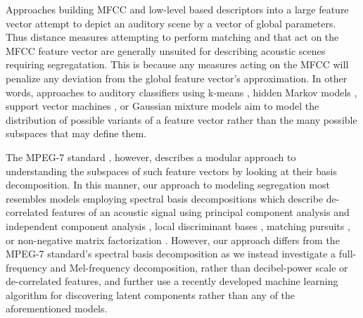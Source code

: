 \documentclass[a4paper,10pt,final]{ThesisStyle}
\begin{document}



Approaches building MFCC and low-level based descriptors into a large feature vector attempt to depict an auditory scene by a vector of global parameters. Thus distance measures attempting to perform matching and that act on the MFCC feature vector are generally unsuited for describing acoustic scenes requiring segregatation.  This is because any measures acting on the MFCC will penalize any deviation from the global feature vector's approximation.  In other words, approaches to auditory classifiers using k-means \cite{Harma2005,Eronen2006,Allamanche2001}, hidden Markov models \cite{Eronen2006,Mesaros2010}, support vector machines \cite{Guo2003a}, or Gaussian mixture models \cite{Wang2011,Aucouturier2007a,Pampalk2006a} aim to model the distribution of possible variants of a feature vector rather than the many possible subspaces that may define them. 

The MPEG-7 standard \cite{Casey2001a,Manjunath2002}, however, describes a modular approach to understanding the subspaces of such feature vectors by looking at their basis decomposition.  In this manner, our approach to modeling segregation most resembles models employing spectral basis decompositions which describe de-correlated features of an acoustic signal using principal component analysis and independent component analysis \cite{Casey2001a,Xiong2003,Kim2004}, local discriminant bases \cite{Su2011}, matching pursuits \cite{Chu2009a}, or non-negative matrix factorization \cite{Raj2010}.  However, our approach differs from the MPEG-7 standard's spectral basis decomposition \cite{Casey2001a} as we instead investigate a full-frequency and Mel-frequency decomposition, rather than decibel-power scale or de-correlated features, and further use a recently developed machine learning algorithm for discovering latent components rather than any of the aforementioned models.
\end{document}
